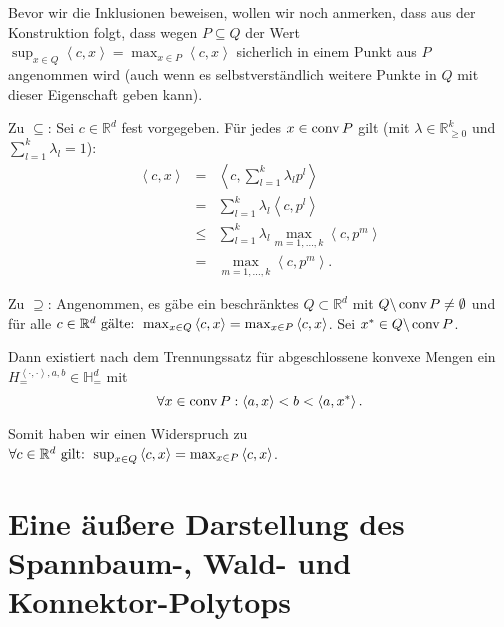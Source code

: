 \documentclass[10p,a4paper,BCOR = 12mm, DIV=15]{scrbook}
\begin{document}
\begin{bew}
Bevor wir die Inklusionen beweisen, wollen wir noch anmerken, dass aus der Konstruktion folgt, dass wegen $P \subseteq Q$ der Wert $\sup_{x \in Q} \left\langle c, x\right\rangle = \max_{x \in P} \left\langle c, x\right\rangle$ sicherlich in einem Punkt aus $P$ angenommen wird (auch wenn es selbstverständlich weitere Punkte in $Q$ mit dieser Eigenschaft geben kann).

Zu $\subseteq$: Sei $c\in \mathbb{R}^d$ fest vorgegeben. Für jedes $x\in \operatorname{conv} P$ gilt (mit $\lambda \in \mathbb{R}_{\geq 0}^k$ und $\sum_{l=1}^k \lambda_l =1$):
\begin{eqnarray*}
\left\langle c, x \right\rangle & = & \left\langle c, \sum_{l=1}^k \lambda_l p^l \right\rangle \\
& = & \sum_{l=1}^k \lambda_l \left\langle c, p^l \right\rangle \\
& \leq & \sum_{l=1}^k \lambda_l \max_{m=1, \ldots, k} \left\langle c, p^m \right\rangle \\
& = & \max_{m=1, \ldots, k} \left\langle c, p^m \right\rangle.
\end{eqnarray*}

Zu $\supseteq$: Angenommen, es gäbe ein beschränktes $Q \subset \mathbb{R}^d$ mit $Q \backslash \operatorname{conv} P \neq \emptyset$ und für alle $c \in \mathbb{R}^d\textnormal{ gälte: } \max_{x \in Q} \left\langle c, x\right\rangle = \max_{x \in P} \left\langle c, x\right\rangle$. Sei $x^* \in Q \backslash \operatorname{conv} P$.

Dann existiert nach dem Trennungssatz für abgeschlossene konvexe Mengen ein  $H_=^{\left\langle\cdot, \cdot\right\rangle, a, b} \in \mathbb{H}_{=}^d$ mit
\begin{displaymath}
\forall x \in \operatorname{conv} P: \left\langle a, x\right\rangle < b < \left\langle a, x^*\right\rangle.
\end{displaymath}

Somit haben wir einen Widerspruch zu $\forall c \in \mathbb{R}^d\textnormal{ gilt: } \sup_{x \in Q} \left\langle c, x\right\rangle = \max_{x \in P} \left\langle c, x\right\rangle$.
\end{bew}

\section{Eine äußere Darstellung des Spannbaum-, Wald- und Konnektor-Polytops}
\end{document}
